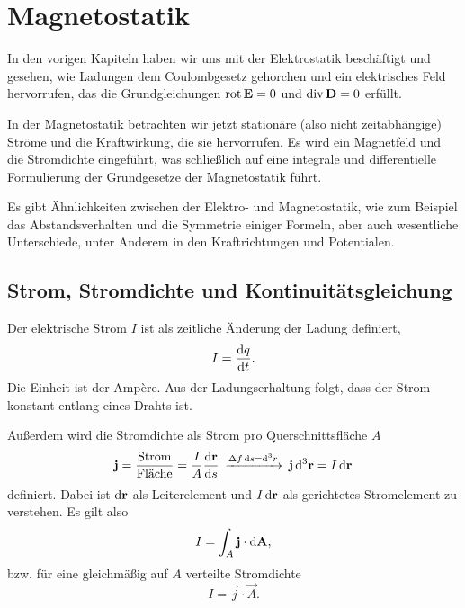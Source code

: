 \chapter{Magnetostatik}


In den vorigen Kapiteln haben wir uns mit der Elektrostatik beschäftigt und gesehen, wie Ladungen dem Coulombgesetz gehorchen und ein elektrisches Feld hervorrufen, das die Grundgleichungen $\rot \vec {E}=0$ und $\divg \vec {D}=0$ erfüllt.

In der Magnetostatik betrachten wir jetzt stationäre (also nicht zeitabhängige) Ströme und die Kraftwirkung, die sie hervorrufen. Es wird ein Magnetfeld und die Stromdichte eingeführt, was schließlich auf eine integrale und differentielle Formulierung der Grundgesetze der Magnetostatik führt.

Es gibt Ähnlichkeiten zwischen der Elektro- und Magnetostatik, wie zum Beispiel das Abstandsverhalten und die Symmetrie einiger Formeln, aber auch wesentliche Unterschiede, unter Anderem in den Kraftrichtungen und Potentialen.

\section{Strom, Stromdichte und Kontinuitätsgleichung}

Der elektrische Strom $I$ ist als zeitliche Änderung der Ladung definiert,
\begin{equation*}
	I=\frac{\diff q}{\diff t}.
\end{equation*}
Die Einheit ist der Ampère. Aus der Ladungserhaltung folgt, dass der Strom konstant entlang eines Drahts ist.

Außerdem wird die Stromdichte als Strom pro Querschnittsfläche $A$
\begin{equation*}
	\vec {j}=\frac{\text{Strom}}{\text{Fläche}}=\frac{I}{A}\frac{\diff \vec {\vec {r}}}{\diff s}\:\xrightarrow{\Delta  f\diff s=\diff ^{3}r}\: \vec {j}\diffa[3]{\vec{r}}=I\diff \vec {r}
\end{equation*}
definiert. Dabei ist $\diff\vec r$ als Leiterelement und $I\diff\vec r$ als gerichtetes Stromelement zu verstehen. Es gilt also
\begin{equation*}
	I=\int_A \vec j \cdot \diff \vec A,
\end{equation*}
bzw. für eine gleichmäßig auf $A$ verteilte Stromdichte
\begin{equation*}
	I=\vec j\cdot \vec A.
\end{equation*}

